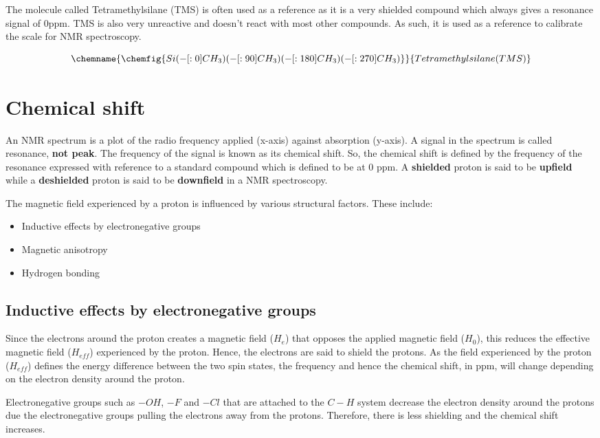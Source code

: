 \documentclass[11pt]{article}
\begin{document}
The molecule called Tetramethylsilane (TMS) is often used as a reference as it is a very shielded compound which always gives a resonance signal of 0ppm. TMS is also very unreactive and doesn't react with most other compounds. As such, it is used as a reference to calibrate the scale for NMR spectroscopy.

\[
\chemname{
\chemfig{Si(-[:0]CH_3)(-[:90]CH_3)(-[:180]CH_3)(-[:270]CH_3)}
}{Tetramethylsilane (TMS)}
\]


\section{Chemical shift}
\label{sec:orgb801336}
An NMR spectrum is a plot of the radio frequency applied (x-axis) against absorption (y-axis). A signal in the spectrum is called resonance, \textbf{not peak}. The frequency of the signal is known as its chemical shift. So, the chemical shift is defined by the frequency of the resonance expressed with reference to a standard compound which is defined to be at 0 ppm. A \textbf{shielded} proton is said to be \textbf{upfield} while a \textbf{deshielded} proton is said to be \textbf{downfield} in a NMR spectroscopy.

The magnetic field experienced by a proton is influenced by various structural factors. These include:
\begin{itemize}
\item Inductive effects by electronegative groups
\item Magnetic anisotropy
\item Hydrogen bonding
\end{itemize}

\newpage

\subsection{Inductive effects by electronegative groups}
\label{sec:orgfd98e73}
Since the electrons around the proton creates a magnetic field (\(H_e\)) that opposes the applied magnetic field (\(H_0\)), this reduces the effective magnetic field (\(H_{eff}\)) experienced by the proton. Hence, the electrons are said to shield the protons. As the field experienced by the proton (\(H_{eff}\)) defines the energy difference between the two spin states, the frequency and hence the chemical shift, in ppm, will change depending on the electron density around the proton.

Electronegative groups such as \(-OH\), \(-F\) and \(-Cl\) that are attached to the \(C-H\) system decrease the electron density around the protons due the electronegative groups pulling the electrons away from the protons. Therefore, there is less shielding and the chemical shift increases.
\end{document}

